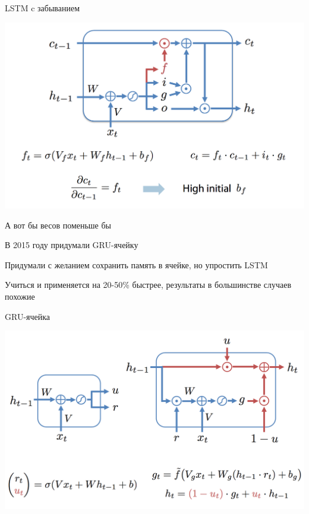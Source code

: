 \documentclass[notes,12pt, aspectratio=169]{beamer}
\newenvironment{wideitemize}{\itemize\addtolength{\itemsep}{10pt}}{\enditemize}
\begin{document}
\begin{frame}{LSTM c забыванием}
\begin{center}
	\includegraphics[width=.8\linewidth]{lstm9.png}
\end{center}
\end{frame}


\begin{frame}{А вот бы весов поменьше бы}
\begin{wideitemize}
	\item  В 2015 году придумали GRU-ячейку
	
	\item Придумали с желанием сохранить память в ячейке, но упростить LSTM
	
	\item Учиться и применяется на 20-50\% быстрее, результаты в большинстве случаев похожие
	
\end{wideitemize}
\end{frame}


\begin{frame}{GRU-ячейка}
\begin{center}
\includegraphics[width=.8\linewidth]{gry_1.png}
\end{center}
\end{frame}
\end{document}
